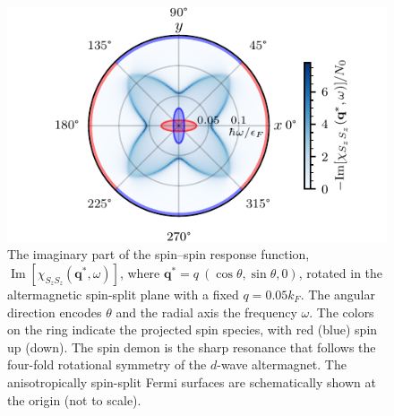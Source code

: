 \documentclass[aps,prl,reprint,twocolumns,superscriptaddress]{revtex4-2}
\DeclareMathOperator{\Imm}{Im}
\newcommand{\kF}{k_{F}}
\newenvironment{DIFnomarkup}{}{}
\begin{document}
	\begin{DIFnomarkup}
	\begin{figure}
		\includegraphics[width=\columnwidth]{polar-plot-chiSzSz}
		\caption{The imaginary part of the spin–spin response function, $\Imm[\chi_{S_zS_z}(\bm q^*,\omega)]$, where $\bm q^*=q\ (\cos\theta,\sin\theta,0)$, rotated in the altermagnetic spin-split plane with a fixed $q=0.05\kF$. The angular direction encodes $\theta$ and the radial axis the frequency $\omega$. The colors on the ring indicate the projected spin species, with red (blue) spin up (down). The spin demon is the sharp resonance that follows the four-fold rotational symmetry of the $d$-wave altermagnet. The anisotropically spin-split Fermi surfaces are schematically shown at the origin (not to scale). \label{fig:polar}	}
	\end{figure}
	

\end{DIFnomarkup}
\end{document}
